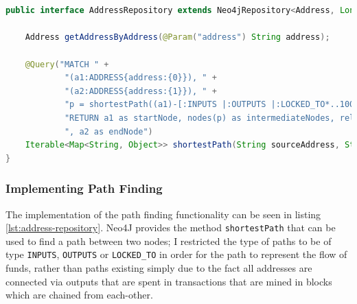 \begin{lstlisting}[language=Java, label={lst:address-repository}, caption={AddressRepository interface definition}, breaklines=true, basicstyle=\small]


public interface AddressRepository extends Neo4jRepository<Address, Long> {

    Address getAddressByAddress(@Param("address") String address);

    @Query("MATCH " +
            "(a1:ADDRESS{address:{0}}), " +
            "(a2:ADDRESS{address:{1}}), " +
            "p = shortestPath((a1)-[:INPUTS |:OUTPUTS |:LOCKED_TO*..100]-(a2)) " +
            "RETURN a1 as startNode, nodes(p) as intermediateNodes, relationships(p) as rels" +
            ", a2 as endNode")
    Iterable<Map<String, Object>> shortestPath(String sourceAddress, String destinationAddress);
}
\end{lstlisting}

\subsubsection{Implementing Path Finding}
The implementation of the path finding functionality can be seen in listing \ref{lst:address-repository}. Neo4J provides the method \texttt{shortestPath} that can be used to find a path between two nodes; I restricted the type of paths to be of type \texttt{INPUTS}, \texttt{OUTPUTS} or \texttt{LOCKED\_TO} in order for the path to represent the flow of funds, rather than paths existing simply due to the fact all addresses are connected via outputs that are spent in transactions that are mined in blocks which are chained from each-other.


